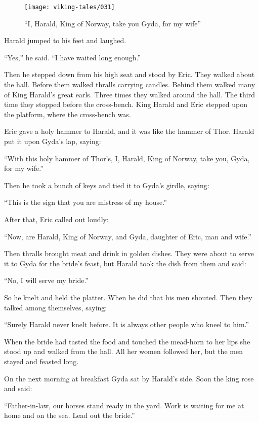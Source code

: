 \begin{figure}[ht]
    \centering
    \texttt{[image: viking-tales/031]}
    \caption{``I, Harald, King of Norway, take you Gyda, for my wife''}
\end{figure}

Harald jumped to his feet and laughed.

``Yes,'' he said. ``I have waited long enough.''

Then he stepped down from his high seat and stood by Eric. They walked
about the hall. Before them walked thralls carrying candles. Behind them
walked many of King Harald's great earls. Three times they walked around
the hall. The third time they stopped before the cross-bench. King
Harald and Eric stepped upon the platform, where the cross-bench was.

Eric gave a holy hammer to Harald, and it was like the hammer of Thor.
Harald put it upon Gyda's lap, saying:

``With this holy hammer of Thor's, I, Harald, King of Norway, take you,
Gyda, for my wife.''

Then he took a bunch of keys and tied it to Gyda's girdle, saying:

``This is the sign that you are mistress of my house.''

After that, Eric called out loudly:

``Now, are Harald, King of Norway, and Gyda, daughter of Eric, man and
wife.''

Then thralls brought meat and drink in golden dishes. They were about to
serve it to Gyda for the bride's feast, but Harald took the dish from
them and said:

``No, I will serve my bride.''

So he knelt and held the platter. When he did that his men shouted. Then
they talked among themselves, saying:

``Surely Harald never knelt before. It is always other people who kneel
to him.''

When the bride had tasted the food and touched the mead-horn to her lips
she stood up and walked from the hall. All her women followed her, but
the men stayed and feasted long.

On the next morning at breakfast Gyda sat by Harald's side. Soon the
king rose and said:

``Father-in-law, our horses stand ready in the yard. Work is waiting for
me at home and on the sea. Lead out the bride.''

